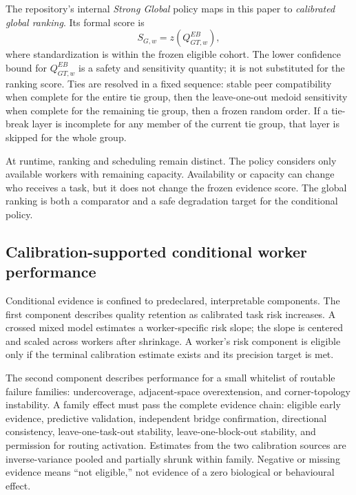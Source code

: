 The repository's internal \emph{Strong Global} policy maps in this paper to \emph{calibrated global ranking}. Its formal score is
\begin{equation}
  S_{G,w}=z\!\left(Q_{GT,w}^{EB}\right),
  \label{eq:global}
\end{equation}
where standardization is within the frozen eligible cohort. The lower confidence bound for $Q_{GT,w}^{EB}$ is a safety and sensitivity quantity; it is not substituted for the ranking score. Ties are resolved in a fixed sequence: stable peer compatibility when complete for the entire tie group, then the leave-one-out medoid sensitivity when complete for the remaining tie group, then a frozen random order. If a tie-break layer is incomplete for any member of the current tie group, that layer is skipped for the whole group.

At runtime, ranking and scheduling remain distinct. The policy considers only available workers with remaining capacity. Availability or capacity can change who receives a task, but it does not change the frozen evidence score. The global ranking is both a comparator and a safe degradation target for the conditional policy.

\subsection{Calibration-supported conditional worker performance}

Conditional evidence is confined to predeclared, interpretable components. The first component describes quality retention as calibrated task risk increases. A crossed mixed model estimates a worker-specific risk slope; the slope is centered and scaled across workers after shrinkage. A worker's risk component is eligible only if the terminal calibration estimate exists and its precision target is met.

The second component describes performance for a small whitelist of routable failure families: undercoverage, adjacent-space overextension, and corner-topology instability. A family effect must pass the complete evidence chain: eligible early evidence, predictive validation, independent bridge confirmation, directional consistency, leave-one-task-out stability, leave-one-block-out stability, and permission for routing activation. Estimates from the two calibration sources are inverse-variance pooled and partially shrunk within family. Negative or missing evidence means ``not eligible,'' not evidence of a zero biological or behavioural effect.

